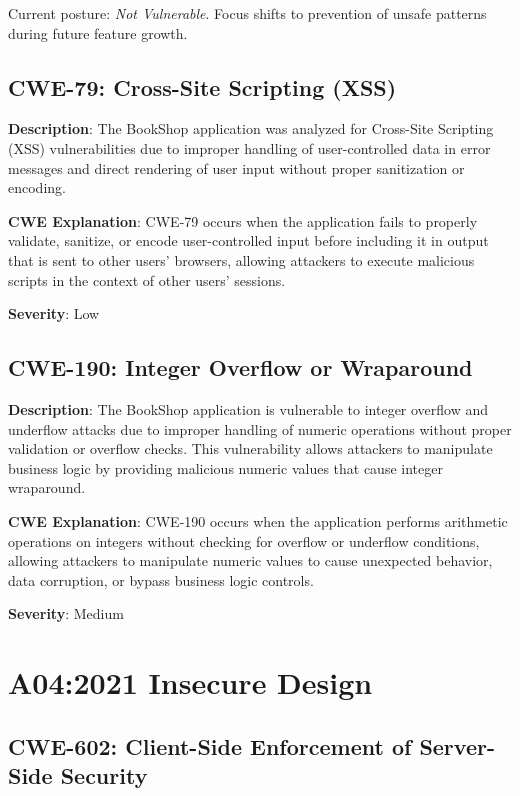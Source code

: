 \documentclass[]{UCD_CS_FYP_Report}
\begin{document}
Current posture: \textit{Not Vulnerable}. Focus shifts to prevention of unsafe patterns during future feature growth.


\section{CWE-79: Cross-Site Scripting (XSS)}

\textbf{Description}: The BookShop application was analyzed for Cross-Site Scripting (XSS) vulnerabilities due to improper handling of user-controlled data in error messages and direct rendering of user input without proper sanitization or encoding.

\textbf{CWE Explanation}: CWE-79 occurs when the application fails to properly validate, sanitize, or encode user-controlled input before including it in output that is sent to other users' browsers, allowing attackers to execute malicious scripts in the context of other users' sessions.

\textbf{Severity}: Low



\section{CWE-190: Integer Overflow or Wraparound}

\textbf{Description}: The BookShop application is vulnerable to integer overflow and underflow attacks due to improper handling of numeric operations without proper validation or overflow checks. This vulnerability allows attackers to manipulate business logic by providing malicious numeric values that cause integer wraparound.

\textbf{CWE Explanation}: CWE-190 occurs when the application performs arithmetic operations on integers without checking for overflow or underflow conditions, allowing attackers to manipulate numeric values to cause unexpected behavior, data corruption, or bypass business logic controls.

\textbf{Severity}: Medium



\chapter{A04:2021 Insecure Design}

\section{CWE-602: Client-Side Enforcement of Server-Side Security}
\end{document}
